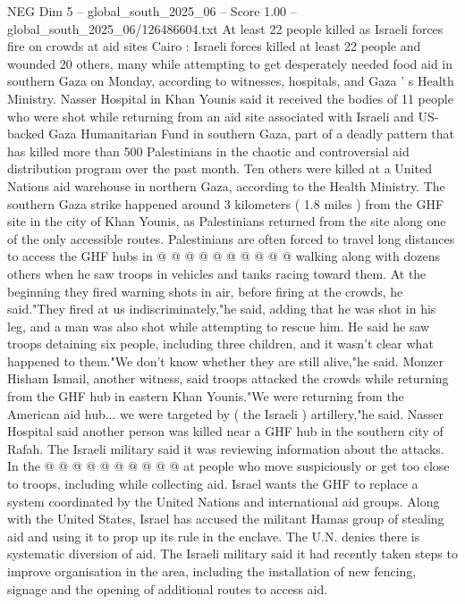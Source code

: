 \begin{textsample}{NEG Dim 5 – global\_south\_2025\_06 – Score 1.00 – global\_south\_2025\_06/126486604.txt}  \label{ex:f5_neg_413}
At least 22 people killed as Israeli forces fire on crowds at aid sites Cairo : Israeli forces killed at least 22 people and wounded 20 others, many while attempting to get desperately needed food aid in southern Gaza on Monday, according to witnesses, hospitals, and Gaza ' s Health Ministry.
Nasser Hospital in Khan Younis said it received the bodies of 11 people who were shot while returning from an aid site associated with Israeli and US-backed Gaza Humanitarian Fund in southern Gaza, part of a deadly pattern that has killed more than 500 Palestinians in the chaotic and controversial aid distribution program over the past month.
Ten others were killed at a United Nations aid warehouse in northern Gaza, according to the Health Ministry.
The southern Gaza strike happened around 3 kilometers ( 1.8 miles ) from the GHF site in the city of Khan Younis, as Palestinians returned from the site along one of the only accessible routes.
Palestinians are often forced to travel long distances to access the GHF hubs in @ @ @ @ @ @ @ @ @ @ walking along with dozens others when he saw troops in vehicles and tanks racing toward them.
At the beginning they fired warning shots in air, before firing at the crowds, he said."They fired at us indiscriminately,"he said, adding that he was shot in his leg, and a man was also shot while attempting to rescue him.
He said he saw troops detaining six people, including three children, and it wasn't clear what happened to them."We don't know whether they are still alive,"he said.
Monzer Hisham Ismail, another witness, said troops attacked the crowds while returning from the GHF hub in eastern Khan Younis."We were returning from the American aid hub... we were targeted by ( the Israeli ) artillery,"he said.
Nasser Hospital said another person was killed near a GHF hub in the southern city of Rafah.
The Israeli military said it was reviewing information about the attacks.
In the @ @ @ @ @ @ @ @ @ @ at people who move suspiciously or get too close to troops, including while collecting aid.
Israel wants the GHF to replace a system coordinated by the United Nations and international aid groups.
Along with the United States, Israel has accused the militant Hamas group of stealing aid and using it to prop up its rule in the enclave.
The U.N. denies there is systematic diversion of aid.
The Israeli military said it had recently taken steps to improve organisation in the area, including the installation of new fencing, signage and the opening of additional routes to access aid.

\end{textsample}
